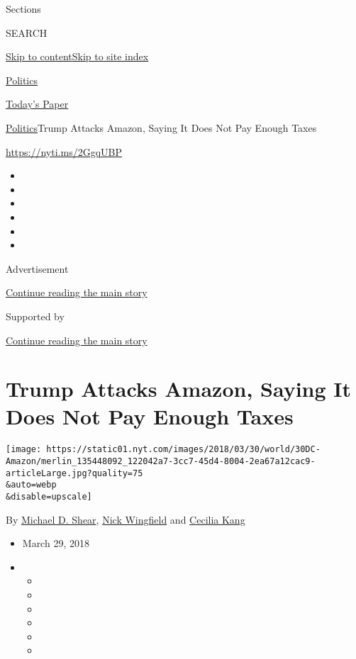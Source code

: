 Sections

SEARCH

\protect\hyperlink{site-content}{Skip to
content}\protect\hyperlink{site-index}{Skip to site index}

\href{https://www.nytimes.com/section/politics}{Politics}

\href{https://myaccount.nytimes.com/auth/login?response_type=cookie\&client_id=vi}{}

\href{https://www.nytimes.com/section/todayspaper}{Today's Paper}

\href{/section/politics}{Politics}\textbar{}Trump Attacks Amazon, Saying
It Does Not Pay Enough Taxes

\url{https://nyti.ms/2GgqUBP}

\begin{itemize}
\item
\item
\item
\item
\item
\item
\end{itemize}

Advertisement

\protect\hyperlink{after-top}{Continue reading the main story}

Supported by

\protect\hyperlink{after-sponsor}{Continue reading the main story}

\hypertarget{trump-attacks-amazon-saying-it-does-not-pay-enough-taxes}{%
\section{Trump Attacks Amazon, Saying It Does Not Pay Enough
Taxes}\label{trump-attacks-amazon-saying-it-does-not-pay-enough-taxes}}

\texttt{[image: https://static01.nyt.com/images/2018/03/30/world/30DC-Amazon/merlin\_135448092\_122042a7-3cc7-45d4-8004-2ea67a12cac9-articleLarge.jpg?quality=75\\\&auto=webp\\\&disable=upscale]}

By \href{https://www.nytimes.com/by/michael-d-shear}{Michael D. Shear},
\href{https://www.nytimes.com/by/nick-wingfield}{Nick Wingfield} and
\href{https://www.nytimes.com/by/cecilia-kang}{Cecilia Kang}

\begin{itemize}
\item
  March 29, 2018
\item
  \begin{itemize}
  \item
  \item
  \item
  \item
  \item
  \item
  \end{itemize}
\end{itemize}

